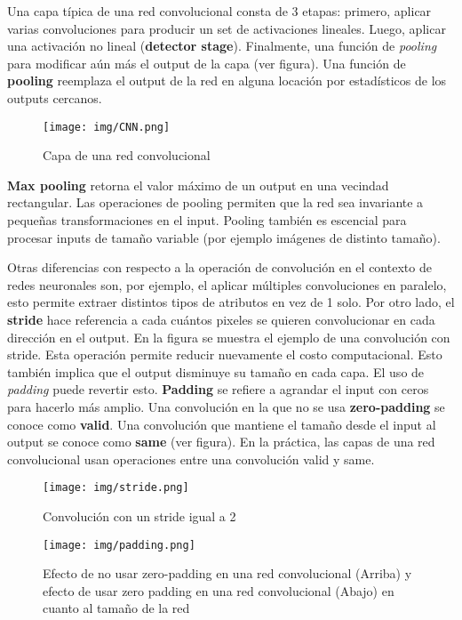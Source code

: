Una capa t\'ipica de una red convolucional consta de 3 etapas: primero, aplicar varias convoluciones para producir un set de activaciones lineales. Luego, aplicar una activaci\'on no lineal (\textbf{detector stage}). Finalmente, una funci\'on de \textit{pooling} para modificar a\'un m\'as el output de la capa (ver figura). Una funci\'on de \textbf{pooling} reemplaza el output de la red en alguna locaci\'on por estad\'isticos de los outputs cercanos. 

\begin{figure}[H]
\captionsetup{font=small,labelfont=small}
\caption{Capa de una red convolucional}
\centering
\texttt{[image: img/CNN.png]}
\end{figure}

\textbf{Max pooling} retorna el valor m\'aximo de un output en una vecindad rectangular. Las operaciones de pooling permiten que la red sea invariante a peque{\~{n}}as transformaciones en el input. Pooling tambi\'en es escencial para procesar inputs de tama{\~{n}}o variable (por ejemplo im\'agenes de distinto tama{\~{n}}o).

Otras diferencias con respecto a la operaci\'on de convoluci\'on en el contexto de redes neuronales son, por ejemplo, el aplicar m\'ultiples convoluciones en paralelo, esto permite extraer distintos tipos de atributos en vez de 1 solo. Por otro lado, el \textbf{stride} hace referencia a cada cu\'antos pixeles se quieren convolucionar en cada direcci\'on en el output. En la figura se muestra el ejemplo de una convoluci\'on con stride. Esta operaci\'on permite reducir nuevamente el costo computacional. Esto tambi\'en implica que el output disminuye su tama{\~{n}}o en cada capa. El uso de \textit{padding} puede revertir esto. \textbf{Padding} se refiere a agrandar el input con ceros para hacerlo m\'as amplio. Una convoluci\'on en la que no se usa \textbf{zero-padding} se conoce como \textbf{valid}. Una convoluci\'on que mantiene el tama{\~{n}}o desde el input al output se conoce como \textbf{same} (ver figura). En la pr\'actica, las capas de una red convolucional usan operaciones entre una convoluci\'on valid y same.

\begin{figure}[H]
\captionsetup{font=small,labelfont=small}
\caption{Convoluci\'on con un stride igual a 2}
\centering
\texttt{[image: img/stride.png]}
\end{figure}

\begin{figure}[H]
\captionsetup{font=small,labelfont=small}
\caption{Efecto de no usar zero-padding en una red convolucional (Arriba) y efecto de usar zero padding en una red convolucional (Abajo) en cuanto al tama{\~{n}}o de la red}
\centering
\texttt{[image: img/padding.png]}
\end{figure}

